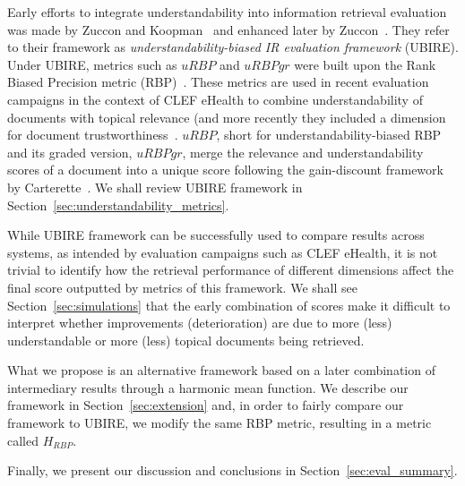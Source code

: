 Early efforts to integrate understandability into information retrieval evaluation was made by Zuccon and Koopman~\cite{zuccon14} and enhanced later by Zuccon~\cite{zuccon16}.
They refer to their framework as \textit{understandability-biased IR evaluation framework} (UBIRE).
Under UBIRE, metrics such as $uRBP$ and $uRBPgr$ were built upon the Rank Biased Precision metric (RBP)~\cite{moffat08}. These metrics are used in recent evaluation campaigns in the context of CLEF eHealth to combine understandability of documents with topical relevance (and more recently they included a dimension for document trustworthiness~\cite{clef17}.
$uRBP$, short for understandability-biased RBP and its graded version, $uRBPgr$, merge the relevance and understandability scores of a document into a unique score following the gain-discount framework by Carterette~\cite{carterette11}. We shall review UBIRE framework in Section~\ref{sec:understandability_metrics}. 

While UBIRE framework can be successfully used to compare results across systems, as intended by evaluation campaigns such as CLEF eHealth, it is not trivial to identify how the retrieval performance of different dimensions affect the final score outputted by metrics of this framework.
We shall see Section~\ref{sec:simulations} that the early combination of scores make it difficult to interpret whether improvements (deterioration) are due to more (less) understandable or more (less) topical documents being retrieved.

What we propose is an alternative framework based on a later combination of intermediary results through a harmonic mean function.
We describe our framework in Section~\ref{sec:extension} and, in order to fairly compare our framework to UBIRE, we modify the same RBP metric, resulting in a metric called $H_{RBP}$.

Finally, we present our discussion and conclusions in Section~\ref{sec:eval_summary}.



